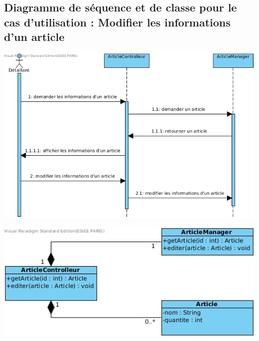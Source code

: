 \subsection{Diagramme de séquence et de classe pour le cas d'utilisation : Modifier les informations d'un article}
\begin{center}
	\includegraphics[width=14cm]{DiagrammeSequenceModifierInfoArticle.jpg}
\end{center}
\begin{center}
	\includegraphics[width=14cm]{DiagrammeDeClasseModifierInfoArticle.jpg}
\end{center}


